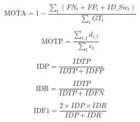 \begin{equation}
	\text{MOTA} = 1 - \frac{\sum_{t}(FN_t + FP_t + ID\_Sw_t)}{\sum_t GT_t}
	\label{eq:mota}
\end{equation}

\begin{equation}
	\text{MOTP} = \frac{\sum_{i,t}d_{i,t}}{\sum_{t}c_t}
	\label{eq:motp}
\end{equation}

\begin{equation}
	\text{IDP} = \frac{IDTP}{IDTP + IDFP}
	\label{eq:idp}
\end{equation}

\begin{equation}
	\text{IDR} = \frac{IDTP}{IDTP + IDFN}
	\label{eq:idr}
\end{equation}

\begin{equation}
	\text{IDF1} = \frac{2 \times IDP \times IDR}{IDP + IDR}
	\label{eq:idf1}
\end{equation}